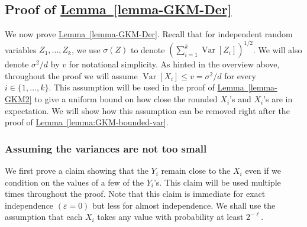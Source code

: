 \documentclass[11pt]{article}
\numberwithin{equation}{section}
\theoremstyle{definition}
\theoremstyle{plain}
\newcommand{\expref}[2]{\hyperref[#2]{#1~\ref{#2}}}
\def\eps{\varepsilon}
\def\Blocklength{\ell}
\DeclareMathOperator*{\Var}{Var}                 %
\begin{document}
  \subsection{Proof of \expref{Lemma}{lemma-GKM-Der}}
  We now prove \expref{Lemma}{lemma-GKM-Der}.
  Recall that for independent random variables $Z_1, \ldots, Z_k$, we use $\sigma(Z)$ to denote $(\sum_{i = 1}^k \Var[Z_i])^{1/2}$.
  We will also denote $\sigma^2 / d$ by $v$ for notational simplicity.
  As hinted in the overview above, throughout the proof we will assume $\Var[X_i] \le v = \sigma^2 / d$ for every $i \in \{1, \ldots, k\}$.
	This assumption will be used in the proof of \expref{Lemma}{lemma-GKM2} to give a uniform bound on how close the rounded $X_i$'s and $X_i$'s are in expectation.
  We will show how this assumption can be removed right after the proof of \expref{Lemma}{lemma:GKM-bounded-var}.


	\subsubsection{Assuming the variances are not too small}

	We first prove a claim showing that the $Y_i$ remain close to the $X_i$ even if we condition on the values of a few of the $Y_i$'s.
	This claim will be used multiple times throughout the proof.
  Note that this claim is immediate for exact independence $(\eps = 0)$ but less for almost independence.
  We shall use the assumption that each $X_i$ takes any value with probability at least $2^{-\Blocklength}$.
\end{document}

